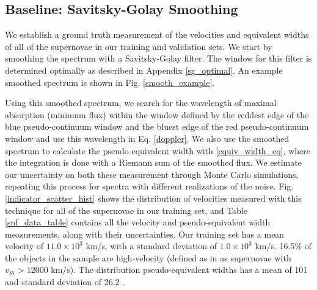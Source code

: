 \subsection{Baseline: Savitsky-Golay Smoothing}
We establish a ground truth measurement of the velocities and equivalent widths of all of the supernovae in our training and validation sets. We start by smoothing the spectrum with a Savitsky-Golay filter. The window for this filter is determined optimally as described in Appendix \ref{sg_optimal}. An example smoothed spectrum is shown in Fig. \ref{smooth_example}.

Using this smoothed spectrum, we search for the wavelength of maximal absorption (minimum flux) within the window defined by the reddest edge of the blue pseudo-continuum window and the bluest edge of the red pseudo-continuum window and use this wavelength in Eq. \ref{doppler}. We also use the smoothed spectrum to calculate the pseudo-equivalent width with \ref{equiv_width_eq}, where the integration is done with a Riemann sum of the smoothed flux. We estimate our uncertainty on both these measurement through Monte Carlo simulations, repeating this process for spectra with different realizations of the noise. Fig. \ref{indicator_scatter_hist} shows the distribution of velocities measured with this technique for all of the supernovae in our training set, and Table \ref{snf_data_table} contains all the velocity and pseudo-equivalent width measurements, along with their uncertainties. Our training set has a mean velocity of $11.0 \times 10^3$ km/s, with a standard deviation of $1.0 \times 10^3$ km/s. 16.5\% of the objects in the sample are high-velocity (defined as in \cite{wang_evidence_2013} as supernovae with $v_{Si}>12000$ km/s). The distribution pseudo-equivalent widths has a mean of 101 \angstrom\; and standard deviation of 26.2 \angstrom.


